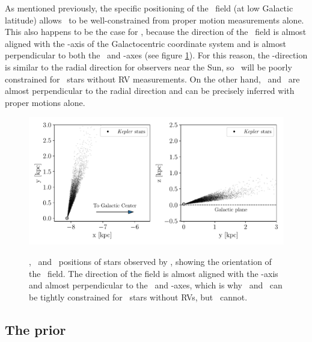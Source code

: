 As mentioned previously, the specific positioning of the \kepler\ field (at
low Galactic latitude) allows \vz\ to be well-constrained from proper motion
measurements alone.
This also happens to be the case for \vx, because the direction of the
\kepler\ field is almost aligned with the \y-axis of the Galactocentric
coordinate system and is almost perpendicular to both the \x\ and \z-axes (see
figure \ref{fig:kepler_field}).
For this reason, the \y-direction is similar to the radial direction for
observers near the Sun, so \vy\ will be poorly constrained for \kepler\ stars
without RV measurements.
On the other hand, \vx\ and \vz\ are almost perpendicular to the radial
direction and can be precisely inferred with proper motions alone.
\begin{figure}[ht!]
\caption{
\x, \y\ and \z\ positions of stars observed by \kepler, showing the
    orientation of the \kepler\ field.
The direction of the field is almost aligned with the \y-axis and almost
    perpendicular to the \x\ and \z-axes, which is why \vx\ and \vz\ can be
    tightly constrained for \kepler\ stars without RVs, but \vy\ cannot.
}
  \centering
    \includegraphics[width=.7\textwidth]{kepler_field}
\label{fig:kepler_field}
\end{figure}

\subsection{The prior}
\label{sec:prior}

